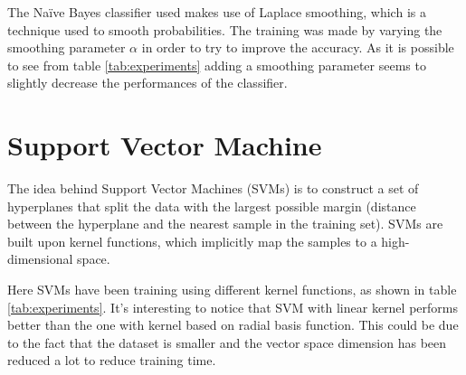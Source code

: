 \documentclass[paper=a4, fontsize=11pt]{scrartcl} %
\numberwithin{equation}{section} %
\numberwithin{figure}{section} %
\numberwithin{table}{section} %
\theoremstyle{definition}
\begin{document}
The Na\"ive Bayes classifier used makes use of Laplace smoothing, which is a
technique used to smooth probabilities. The training was made by varying the
smoothing parameter $\alpha$ in order to try to improve the accuracy. As it is
possible to see from table \ref{tab:experiments} adding a smoothing parameter
seems to slightly decrease the performances of the classifier.



\section{Support Vector Machine}

The idea behind Support Vector Machines (SVMs) is to construct a set of hyperplanes that
split the data with the largest possible margin (distance between the hyperplane
and the nearest sample in the training set). SVMs are built upon kernel functions,
which implicitly map the samples to a high-dimensional space.

Here SVMs have been training using different kernel functions, as shown in
table \ref{tab:experiments}. It's interesting to notice that SVM with linear kernel
performs better than the one with kernel based on radial basis function. This
could be due to the fact that the dataset is smaller and the vector space dimension
has been reduced a lot to reduce training time.
\end{document}
